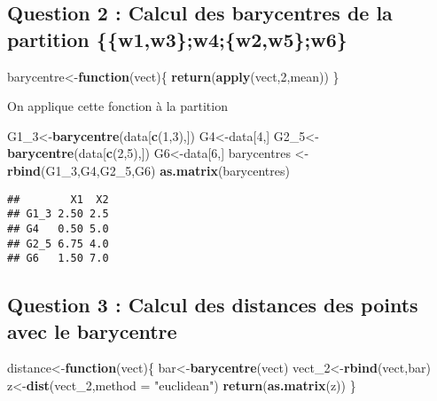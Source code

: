 \documentclass[]{article}
\newenvironment{Shaded}{\begin{snugshade}}{\end{snugshade}}
\newcommand{\ControlFlowTok}[1]{\textcolor[rgb]{0.13,0.29,0.53}{\textbf{#1}}}
\newcommand{\DataTypeTok}[1]{\textcolor[rgb]{0.13,0.29,0.53}{#1}}
\newcommand{\DecValTok}[1]{\textcolor[rgb]{0.00,0.00,0.81}{#1}}
\newcommand{\KeywordTok}[1]{\textcolor[rgb]{0.13,0.29,0.53}{\textbf{#1}}}
\newcommand{\NormalTok}[1]{#1}
\newcommand{\StringTok}[1]{\textcolor[rgb]{0.31,0.60,0.02}{#1}}
\begin{document}
\hypertarget{question-2-calcul-des-barycentres-de-la-partition-w1w3w4w2w5w6}{%
\subsection{Question 2 : Calcul des barycentres de la partition
\{\{w1,w3\};w4;\{w2,w5\};w6\}}\label{question-2-calcul-des-barycentres-de-la-partition-w1w3w4w2w5w6}}

\begin{Shaded}
\begin{Highlighting}[]
\NormalTok{barycentre<-}\ControlFlowTok{function}\NormalTok{(vect)\{}
  \KeywordTok{return}\NormalTok{(}\KeywordTok{apply}\NormalTok{(vect,}\DecValTok{2}\NormalTok{,mean))}
\NormalTok{\}}
\end{Highlighting}
\end{Shaded}

On applique cette fonction à la partition

\begin{Shaded}
\begin{Highlighting}[]
\NormalTok{G1_}\DecValTok{3}\NormalTok{<-}\KeywordTok{barycentre}\NormalTok{(data[}\KeywordTok{c}\NormalTok{(}\DecValTok{1}\NormalTok{,}\DecValTok{3}\NormalTok{),])}
\NormalTok{G4<-data[}\DecValTok{4}\NormalTok{,]}
\NormalTok{G2_}\DecValTok{5}\NormalTok{<-}\KeywordTok{barycentre}\NormalTok{(data[}\KeywordTok{c}\NormalTok{(}\DecValTok{2}\NormalTok{,}\DecValTok{5}\NormalTok{),])}
\NormalTok{G6<-data[}\DecValTok{6}\NormalTok{,]}
\NormalTok{barycentres <-}\StringTok{ }\KeywordTok{rbind}\NormalTok{(G1_}\DecValTok{3}\NormalTok{,G4,G2_}\DecValTok{5}\NormalTok{,G6)}
\KeywordTok{as.matrix}\NormalTok{(barycentres)}
\end{Highlighting}
\end{Shaded}

\begin{verbatim}
##        X1  X2
## G1_3 2.50 2.5
## G4   0.50 5.0
## G2_5 6.75 4.0
## G6   1.50 7.0
\end{verbatim}

\hypertarget{question-3-calcul-des-distances-des-points-avec-le-barycentre}{%
\subsection{Question 3 : Calcul des distances des points avec le
barycentre}\label{question-3-calcul-des-distances-des-points-avec-le-barycentre}}

\begin{Shaded}
\begin{Highlighting}[]
\NormalTok{distance<-}\ControlFlowTok{function}\NormalTok{(vect)\{}
\NormalTok{  bar<-}\KeywordTok{barycentre}\NormalTok{(vect)}
\NormalTok{  vect_}\DecValTok{2}\NormalTok{<-}\KeywordTok{rbind}\NormalTok{(vect,bar)}
\NormalTok{  z<-}\KeywordTok{dist}\NormalTok{(vect_}\DecValTok{2}\NormalTok{,}\DataTypeTok{method =} \StringTok{"euclidean"}\NormalTok{)}
  \KeywordTok{return}\NormalTok{(}\KeywordTok{as.matrix}\NormalTok{(z))}
\NormalTok{\}}
\end{Highlighting}
\end{Shaded}
\end{document}

